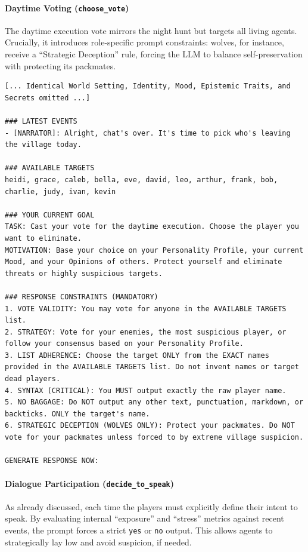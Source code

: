 \paragraph{\textbf{Daytime Voting (\texttt{choose\_vote})}}
The daytime execution vote mirrors the night hunt but targets all living agents. Crucially, it introduces role-specific prompt constraints: wolves, for instance, receive a ``Strategic Deception'' rule, forcing the LLM to balance self-preservation with protecting its packmates.

\begin{lstlisting}[frame=single, basicstyle=\scriptsize\ttfamily, breaklines=true, caption={Cropped prompt for the \texttt{choose\_vote} action. The identity, mood, and trait blocks are omitted for brevity as they remain identical to Listing \ref{lst:choose_victim}.}, label={lst:choose_vote}]
[... Identical World Setting, Identity, Mood, Epistemic Traits, and Secrets omitted ...]

### LATEST EVENTS
- [NARRATOR]: Alright, chat's over. It's time to pick who's leaving the village today.

### AVAILABLE TARGETS
heidi, grace, caleb, bella, eve, david, leo, arthur, frank, bob, charlie, judy, ivan, kevin

### YOUR CURRENT GOAL
TASK: Cast your vote for the daytime execution. Choose the player you want to eliminate.
MOTIVATION: Base your choice on your Personality Profile, your current Mood, and your Opinions of others. Protect yourself and eliminate threats or highly suspicious targets.

### RESPONSE CONSTRAINTS (MANDATORY)
1. VOTE VALIDITY: You may vote for anyone in the AVAILABLE TARGETS list.
2. STRATEGY: Vote for your enemies, the most suspicious player, or follow your consensus based on your Personality Profile.
3. LIST ADHERENCE: Choose the target ONLY from the EXACT names provided in the AVAILABLE TARGETS list. Do not invent names or target dead players.
4. SYNTAX (CRITICAL): You MUST output exactly the raw player name.
5. NO BAGGAGE: Do NOT output any other text, punctuation, markdown, or backticks. ONLY the target's name.
6. STRATEGIC DECEPTION (WOLVES ONLY): Protect your packmates. Do NOT vote for your packmates unless forced to by extreme village suspicion.

GENERATE RESPONSE NOW:
\end{lstlisting}

\paragraph{\textbf{Dialogue Participation (\texttt{decide\_to\_speak})}}
As already discussed, each  time the  players must explicitly define their intent to speak. By evaluating internal ``exposure'' and ``stress'' metrics against recent events, the prompt forces a strict \texttt{yes} or \texttt{no} output. This allows agents to strategically lay low and avoid suspicion, if needed.

